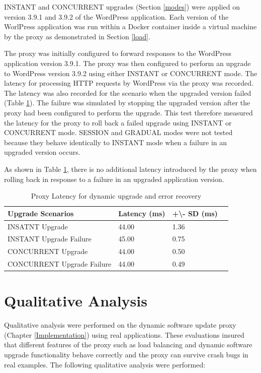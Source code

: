 \documentclass[a4paper,11pt,twoside]{report}
\begin{document}
INSTANT and CONCURRENT upgrades (Section \ref{modes}) were applied on version 3.9.1 and 3.9.2 of the WordPress application. Each version of the WorlPress application was run within a Docker container inside a virtual machine by the proxy as demonstrated in Section \ref{load}.    

The proxy was initially configured to forward responses to the WordPress application version 3.9.1. The proxy was then configured to perform an upgrade to WordPress version 3.9.2 using either INSTANT or CONCURRENT mode. The latency for processing HTTP requests by WordPress via the proxy was recorded. The latency was also recorded for the scenario when the upgraded version failed (Table \ref{upgrade-speed}). The failure was simulated by stopping the upgraded version after the proxy had been configured to perform the upgrade. This test therefore measured the latency for the proxy to roll back a failed upgrade using INSTANT or CONCURRENT mode. SESSION and GRADUAL modes were not tested because they behave identically to INSTANT mode when a failure in an upgraded version occurs.

As shown in Table  {\ref{upgrade-speed}}, there is no additional latency introduced by the proxy when rolling back in response to a failure in an upgraded application version. 
 
\begin{table}
\caption {Proxy Latency for dynamic upgrade and error recovery}
\label{upgrade-speed}
\begin{center}
    \begin{tabular}{ | l | l | l | p{5cm} |}
    \hline
   \textbf{Upgrade Scenarios} & \textbf{Latency (ms)} & \textbf{+\textbackslash }\textbf{- SD (ms)} \\ \hline
    INSATNT Upgrade & 44.00 &1.36 \\ \hline
    INSTANT Upgrade Failure & 45.00 & 0.75\\ \hline
    CONCURRENT Upgrade & 44.00 & 0.50\\ \hline
    CONCURRENT Upgrade Failure & 44.00 & 0.49\\
    \hline
    \end{tabular}
\end{center}
\end{table}

\section{Qualitative Analysis}
Qualitative analysis were performed on the dynamic software update proxy (Chapter \ref{Implementation})  using real applications. These evaluations insured that different features of the proxy such as load balancing and dynamic software upgrade functionality behave correctly and the proxy can survive crash bugs in real examples. The following qualitative analysis were performed: 
\end{document}
